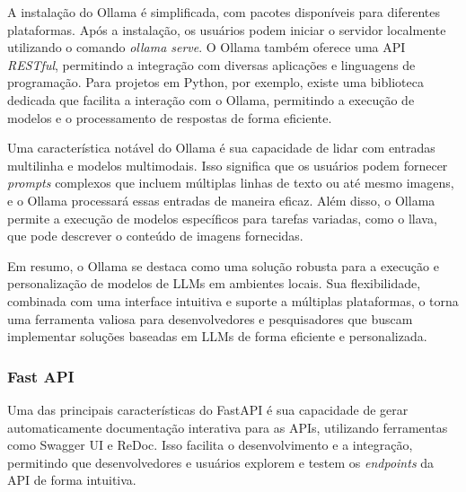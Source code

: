 \documentclass[a4paper, 12pt]{article}
\begin{document}
    A instalação do Ollama é simplificada, com pacotes disponíveis para diferentes plataformas. Após a instalação, os usuários podem iniciar o servidor localmente utilizando o comando \textit{ollama serve}. O Ollama também oferece uma API \textit{RESTful}, permitindo a integração com diversas aplicações e linguagens de programação. Para projetos em Python, por exemplo, existe uma biblioteca dedicada que facilita a interação com o Ollama, permitindo a execução de modelos e o processamento de respostas de forma eficiente.

    Uma característica notável do Ollama é sua capacidade de lidar com entradas multilinha e modelos multimodais. Isso significa que os usuários podem fornecer \textit{prompts} complexos que incluem múltiplas linhas de texto ou até mesmo imagens, e o Ollama processará essas entradas de maneira eficaz. Além disso, o Ollama permite a execução de modelos específicos para tarefas variadas, como o llava, que pode descrever o conteúdo de imagens fornecidas.

    Em resumo, o Ollama se destaca como uma solução robusta para a execução e personalização de modelos de LLMs em ambientes locais. Sua flexibilidade, combinada com uma interface intuitiva e suporte a múltiplas plataformas, o torna uma ferramenta valiosa para desenvolvedores e pesquisadores que buscam implementar soluções baseadas em LLMs de forma eficiente e personalizada.

    \subsubsection{Fast API} \label{sec:fastapi}


    Uma das principais características do FastAPI é sua capacidade de gerar automaticamente documentação interativa para as APIs, utilizando ferramentas como Swagger UI e ReDoc. Isso facilita o desenvolvimento e a integração, permitindo que desenvolvedores e usuários explorem e testem os \textit{endpoints} da API de forma intuitiva.

\end{document}
